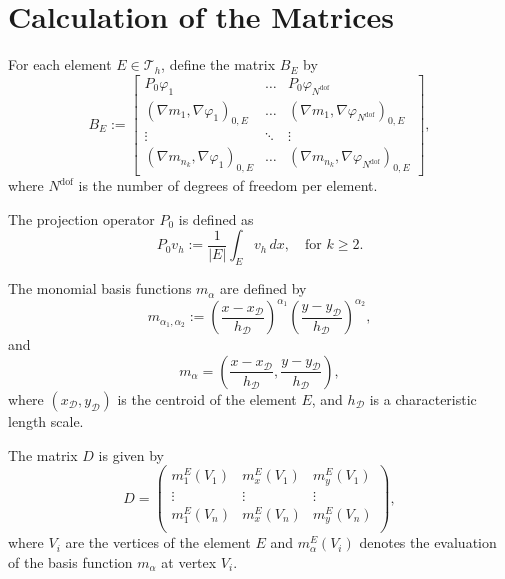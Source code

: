 \documentclass[class=article, crop=false]{standalone}
\begin{document}
\section{Calculation of the Matrices}
For each element $E \in \mathcal{T}_h$, define the matrix $B_E$ by
\[
B_E := \begin{bmatrix}
    P_0 \varphi_1 & \hdots & P_0 \varphi_{N^\text{dof}} \\
    (\nabla m_1, \nabla \varphi_1)_{0,E} & \hdots & (\nabla m_1, \nabla \varphi_{N^\text{dof}})_{0,E} \\
    \vdots & \ddots & \vdots \\
    (\nabla m_{n_k}, \nabla \varphi_1)_{0,E} & \hdots & (\nabla m_{n_k}, \nabla \varphi_{N^\text{dof}})_{0,E}
\end{bmatrix},
\]
where $N^\text{dof}$ is the number of degrees of freedom per element.

The projection operator $P_0$ is defined as
\begin{equation}
    P_0 v_h := \frac{1}{|E|} \int_E v_h \, dx, \quad \text{for } k \geq 2.
\end{equation}

The monomial basis functions $m_{\alpha}$ are defined by
\begin{equation}
    m_{\alpha_1,\alpha_2} := \left( \frac{x - x_{\mathcal{D}}}{h_{\mathcal{D}}} \right)^{\alpha_1}
    \left( \frac{y - y_{\mathcal{D}}}{h_{\mathcal{D}}} \right)^{\alpha_2},
\end{equation}
and
\begin{equation}
    m_{\alpha} = \left( \frac{x - x_{\mathcal{D}}}{h_{\mathcal{D}}}, \frac{y - y_{\mathcal{D}}}{h_{\mathcal{D}}} \right),
\end{equation}
where $(x_{\mathcal{D}}, y_{\mathcal{D}})$ is the centroid of the element $E$, and $h_{\mathcal{D}}$ is a characteristic length scale.

The matrix $D$ is given by
\begin{equation}
    D = \begin{pmatrix}
        m_1^E(V_1) & m_x^E(V_1) & m_y^E(V_1) \\
        \vdots & \vdots & \vdots \\
        m_1^E(V_n) & m_x^E(V_n) & m_y^E(V_n) \\
    \end{pmatrix},
\end{equation}
where $V_i$ are the vertices of the element $E$ and $m_{\alpha}^E(V_i)$ denotes the evaluation of the basis function $m_{\alpha}$ at vertex $V_i$.
\end{document}
